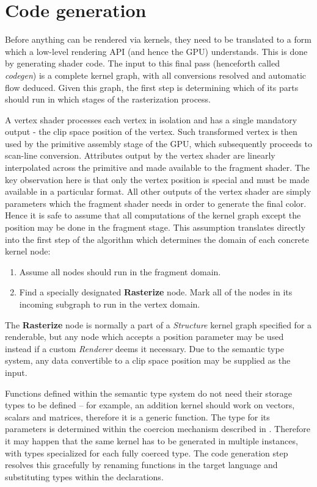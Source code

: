 \section{Code generation}
\label{sec:codegen}

Before anything can be rendered via kernels, they need to be translated to a form which a low-level rendering API (and hence the GPU) understands. This is done by generating shader code. The input to this final pass (henceforth called \emph{codegen}) is a complete kernel graph, with all conversions resolved and automatic flow deduced. Given this graph, the first step is determining which of its parts should run in which stages of the rasterization process.

A vertex shader processes each vertex in isolation and has a single mandatory output - the clip space position of the vertex. Such transformed vertex is then used by the primitive assembly stage of the GPU, which subsequently proceeds to scan-line conversion. Attributes output by the vertex shader are linearly interpolated across the primitive and made available to the fragment shader. The key observation here is that only the vertex position is special and must be made available in a particular format. All other outputs of the vertex shader are simply parameters which the fragment shader needs in order to generate the final color. Hence it is safe to assume that all computations of the kernel graph except the position may be done in the fragment stage. This assumption translates directly into the first step of the algorithm which determines the domain of each concrete kernel node:

\begin{enumerate}
\item Assume all nodes should run in the fragment domain.
\item Find a specially designated \textbf{Rasterize} node. Mark all of the nodes in its incoming subgraph to run in the vertex domain.
\end{enumerate}

The \textbf{Rasterize} node is normally a part of a \emph{Structure} kernel graph specified for a renderable, but any node which accepts a position parameter may be used instead if a custom \emph{Renderer} deems it necessary. Due to the semantic type system, any data convertible to a clip space position may be supplied as the input.

Functions defined within the semantic type system do not need their storage types to be defined -- for example, an addition kernel should work on vectors, scalars and matrices, therefore it is a generic function. The type for its parameters is determined within the coercion mechanism described in . Therefore it may happen that the same kernel has to be generated in multiple instances, with types specialized for each fully coerced type. The code generation step resolves this gracefully by renaming functions in the target language and substituting types within the declarations.

